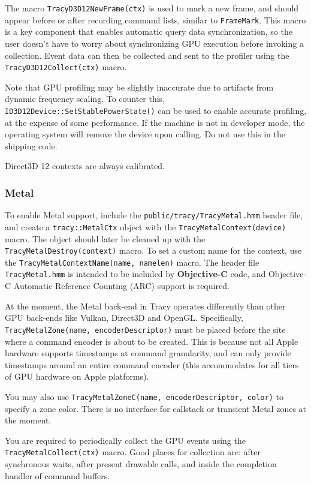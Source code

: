 \documentclass[hidelinks,titlepage,a4paper,twoside]{article}
\begin{document}
The macro \texttt{TracyD3D12NewFrame(ctx)} is used to mark a new frame, and should appear before or after recording command lists, similar to \texttt{FrameMark}. This macro is a key component that enables automatic query data synchronization, so the user doesn't have to worry about synchronizing GPU execution before invoking a collection. Event data can then be collected and sent to the profiler using the \texttt{TracyD3D12Collect(ctx)} macro.

Note that GPU profiling may be slightly inaccurate due to artifacts from dynamic frequency scaling. To counter this, \texttt{ID3D12Device::SetStablePowerState()} can be used to enable accurate profiling, at the expense of some performance. If the machine is not in developer mode, the operating system will remove the device upon calling. Do not use this in the shipping code.

Direct3D 12 contexts are always calibrated.

\subsubsection{Metal}

To enable Metal support, include the \texttt{public/tracy/TracyMetal.hmm} header file, and create a \texttt{tracy::MetalCtx} object with the \texttt{TracyMetalContext(device)} macro. The object should later be cleaned up with the \texttt{TracyMetalDestroy(context)} macro. To set a custom name for the context, use the \texttt{TracyMetalContextName(name, namelen)} macro. The header file \texttt{TracyMetal.hmm} is intended to be included by \textbf{Objective-C} code, and Objective-C Automatic Reference Counting (ARC) support is required.

At the moment, the Metal back-end in Tracy operates differently than other GPU back-ends like Vulkan, Direct3D and OpenGL. Specifically, \texttt{TracyMetalZone(name, encoderDescriptor)} must be placed before the site where a command encoder is about to be created. This is because not all Apple hardware supports timestamps at command granularity, and can only provide timestamps around an entire command encoder (this accommodates for all tiers of GPU hardware on Apple platforms).

You may also use \texttt{TracyMetalZoneC(name, encoderDescriptor, color)} to specify a zone color. There is no interface for callstack or transient Metal zones at the moment.

You are required to periodically collect the GPU events using the \texttt{TracyMetalCollect(ctx)} macro. Good places for collection are: after synchronous waits, after present drawable calls, and inside the completion handler of command buffers.
\end{document}
